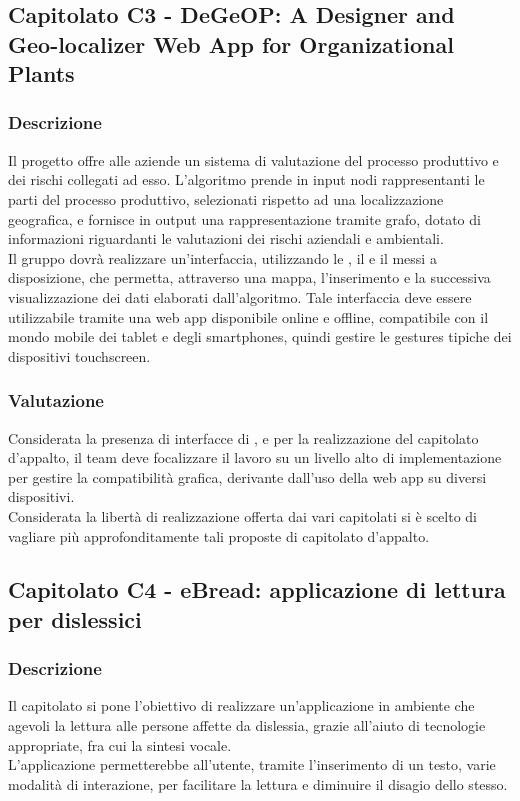\subsection{Capitolato C3 -  DeGeOP: A Designer and Geo-localizer Web App for Organizational Plants}
\subsubsection{Descrizione}
Il progetto offre alle aziende un sistema di valutazione del processo produttivo e dei rischi collegati ad esso. L'algoritmo prende in input nodi rappresentanti le parti del processo produttivo, selezionati rispetto ad una localizzazione geografica, e fornisce in output una rappresentazione tramite grafo, dotato di informazioni riguardanti le valutazioni dei rischi aziendali e ambientali.\\
Il gruppo dovrà realizzare un'interfaccia, utilizzando le , il  e il  messi a disposizione, che permetta, attraverso una mappa, l'inserimento e la successiva visualizzazione dei dati elaborati dall'algoritmo. Tale interfaccia deve essere utilizzabile tramite una web app disponibile online e offline, compatibile con il mondo mobile dei tablet e degli smartphones, quindi gestire le gestures tipiche dei dispositivi touchscreen.

\subsubsection{Valutazione}
Considerata la presenza di interfacce di ,  e  per la realizzazione del capitolato d'appalto, il team deve focalizzare il lavoro su un livello alto di implementazione per gestire la compatibilità grafica, derivante dall'uso della web app su diversi dispositivi.\\
Considerata la libertà di realizzazione offerta dai vari capitolati si è scelto di vagliare più approfonditamente tali proposte di capitolato d'appalto.

\subsection{Capitolato C4 - eBread: applicazione di lettura per dislessici}
\subsubsection{Descrizione}
Il capitolato si pone l'obiettivo di realizzare un'applicazione in ambiente  che agevoli la lettura alle persone affette da dislessia, grazie all'aiuto di tecnologie appropriate, fra cui la sintesi vocale.\\
L'applicazione permetterebbe all'utente, tramite l'inserimento di un testo, varie modalità di interazione, per facilitare la lettura e diminuire il disagio dello stesso.

